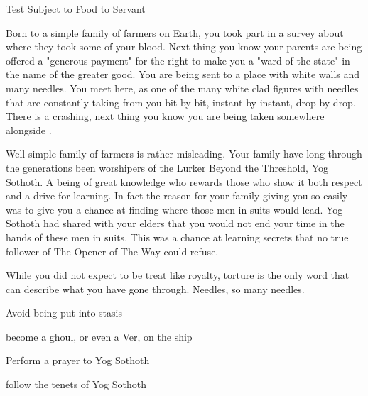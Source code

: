 \documentclass[char]{guildcamp4}
\begin{document}
\name{\cPlead{}}

Test Subject to Food to Servant

Born to a simple family of farmers on Earth, you took part in a survey about where they took some of your blood. Next thing you know your parents 
are being offered a "generous payment" for the right to make you a "ward of the state" in the name of the greater good. You are being sent to a place with white walls and many needles. You meet \cSpite{}  here, as one of the many white clad figures with needles that are constantly taking from you bit by bit, instant by instant, drop by drop. There is a crashing, next thing you know you are being taken somewhere alongside \cSpite{}.

Well simple family of farmers is rather misleading. Your family have long through the generations been worshipers of the Lurker Beyond the Threshold, Yog Sothoth. A being of great knowledge who rewards those who show it both respect and a drive for learning. In fact the reason for your family giving you so easily was to give you a chance at finding where those men in suits would lead. Yog Sothoth had shared with your elders that you would not end your time in the hands of these men in suits. This was a chance at learning secrets that no true follower of The Opener of The Way could refuse. 

While you did not expect to be treat like royalty, torture is the only word that can describe what you have gone through. Needles, so many needles.

\begin{itemz}[Goals]
	\item Avoid being put into stasis
	\item become a ghoul, or even a Ver, on the ship
	\item Perform a prayer to Yog Sothoth
	\item follow the tenets of Yog Sothoth
\end{itemz}

\begin{itemz}[Notes]
	\item 
\end{itemz}

\end{document}
